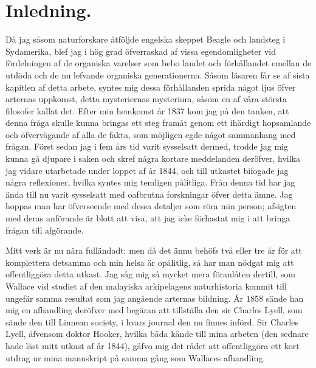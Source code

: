 \chapter*{Inledning.}


Då jag såsom naturforskare åtföljde engelska skeppet Beagle och landsteg i Sydamerika, blef jag i hög grad öfverraskad af vissa egendomligheter vid fördelningen af de organiska varelser som bebo landet och förhållandet emellan de utdöda och de nu lefvande organiska generationerna. Såsom läsaren får se af sista kapitlen af detta arbete, syntes mig dessa förhållanden sprida något ljus öfver arternas uppkomst, detta mysteriernas mysterium, såsom en af våra största filosofer kallat det. Efter min hemkomst år 1837 kom jag på den tanken, att denna fråga skulle kunna bringas ett steg framåt genom ett ihärdigt hopsamlande och öfvervägande af alla de fakta, som möjligen egde något sammanhang med frågan. Först sedan jag i fem års tid varit sysselsatt dermed, trodde jag mig kunna gå djupare i saken och skref några kortare meddelanden deröfver, hvilka jag vidare utarbetade under loppet af år 1844, och till utkastet bifogade jag några reflexioner, hvilka syntes mig temligen pålitliga. Från denna tid har jag ända till nu varit sysselsatt med oafbrutna forskningar öfver detta ämne. Jag hoppas man har öfverseende med dessa detaljer som röra min person; afsigten med deras anförande är blott att visa, att jag icke förhastat mig i att bringa frågan till afgörande.

Mitt verk är nu nära fulländadt; men då det ännu behöfs två eller tre år för att komplettera detsamma och min helsa är opålitlig, så har man nödgat mig att offentliggöra detta utkast. Jag såg mig så mycket mera föranlåten dertill, som Wallace vid studiet af den malayiska arkipelagens naturhistoria kommit till ungefär samma resultat som jag angående arternas bildning. År 1858 sände han mig en afhandling deröfver med begäran att tillställa den sir Charles Lyell, som sände den till Linnean society, i hvars journal den nu finnes införd. Sir Charles Lyell, äfvensom doktor Hooker, hvilka båda kände till mina arbeten (den sednare hade läst mitt utkast af år 1844), gåfvo mig det rådet att offentliggöra ett kort utdrag ur mina manuskript på samma gång som Wallaces afhandling.

